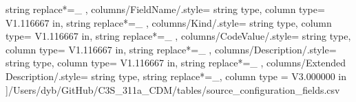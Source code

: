 \begin{landscape}
{            string replace*={_}{}
        },
    columns/FieldName/.style={
            string type, 
            column type= V{1.116667 in}, 
            string replace*={_}{}
        },
    columns/Kind/.style={
            string type, 
            column type= V{1.116667 in}, 
            string replace*={_}{}
        },
    columns/CodeValue/.style={
            string type, 
            column type= V{1.116667 in}, 
            string replace*={_}{}
        },
    columns/Description/.style={
            string type, 
            column type= V{1.116667 in}, 
            string replace*={_}{}
        },
    columns/Extended Description/.style={
            string type, 
            string replace*={_}{},
            column type = V{3.000000 in}
        }
    ]{/Users/dyb/GitHub/C3S_311a_CDM/tables/source_configuration_fields.csv}
\end{landscape}

